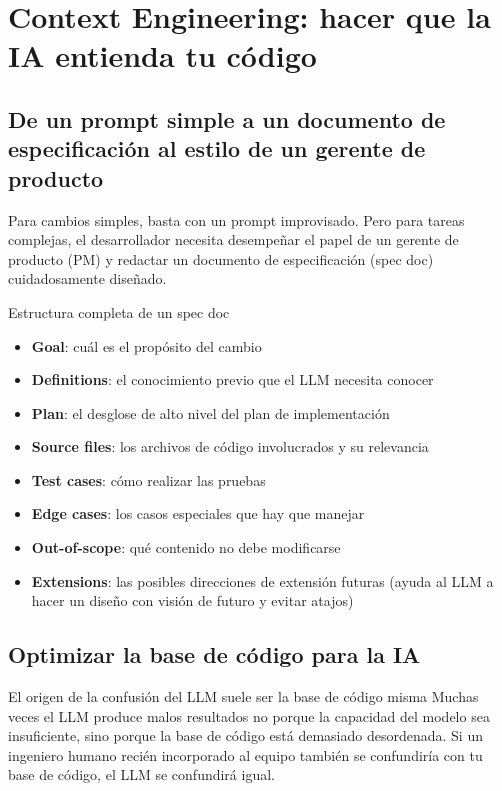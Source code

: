 \section{Context Engineering: hacer que la IA entienda tu código}

\subsection{De un prompt simple a un documento de especificación al estilo de un gerente de producto}

Para cambios simples, basta con un prompt improvisado. Pero para tareas complejas, el desarrollador necesita desempeñar el papel de un gerente de producto (PM) y redactar un documento de especificación (spec doc) cuidadosamente diseñado.

\begin{importantbox}{Estructura completa de un spec doc}
\begin{itemize}
    \item \textbf{Goal}: cuál es el propósito del cambio
    \item \textbf{Definitions}: el conocimiento previo que el LLM necesita conocer
    \item \textbf{Plan}: el desglose de alto nivel del plan de implementación
    \item \textbf{Source files}: los archivos de código involucrados y su relevancia
    \item \textbf{Test cases}: cómo realizar las pruebas
    \item \textbf{Edge cases}: los casos especiales que hay que manejar
    \item \textbf{Out-of-scope}: qué contenido no debe modificarse
    \item \textbf{Extensions}: las posibles direcciones de extensión futuras (ayuda al LLM a hacer un diseño con visión de futuro y evitar atajos)
\end{itemize}
\end{importantbox}

\subsection{Optimizar la base de código para la IA}

\begin{warningbox}{El origen de la confusión del LLM suele ser la base de código misma}
Muchas veces el LLM produce malos resultados no porque la capacidad del modelo sea insuficiente, sino porque la base de código está demasiado desordenada. Si un ingeniero humano recién incorporado al equipo también se confundiría con tu base de código, el LLM se confundirá igual.
\end{warningbox}


